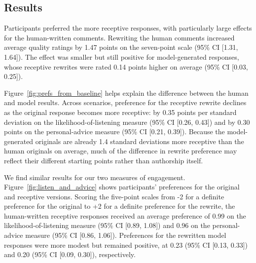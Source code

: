 \documentclass[letterpaper]{article} %
\begin{document}

\subsection{Results}

Participants preferred the more receptive responses, with particularly large effects for the human-written comments. Rewriting the human comments increased average quality ratings by 1.47 points on the seven-point scale (95\% CI [1.31, 1.64]). The effect was smaller but still positive for model-generated responses, whose receptive rewrites were rated 0.14 points higher on average (95\% CI [0.03, 0.25]).

Figure~\ref{fig:prefs_from_baseline} helps explain the difference between the human and model results. Across scenarios, preference for the receptive rewrite declines as the original response becomes more receptive: by 0.35 points per standard deviation on the likelihood-of-listening measure (95\% CI [0.26, 0.43]) and by 0.30 points on the personal-advice measure (95\% CI [0.21, 0.39]). Because the model-generated originals are already 1.4 standard deviations more receptive than the human originals on average, much of the difference in rewrite preference may reflect their different starting points rather than authorship itself.

We find similar results for our two measures of engagement. Figure~\ref{fig:listen_and_advice} shows participants' preferences for the original and receptive versions. Scoring the five-point scales from -2 for a definite preference for the original to +2 for a definite preference for the rewrite, the human-written receptive responses received an average preference of 0.99 on the likelihood-of-listening measure (95\% CI [0.89, 1.08]) and 0.96 on the personal-advice measure (95\% CI [0.86, 1.06]). Preferences for the rewritten model responses were more modest but remained positive, at 0.23 (95\% CI [0.13, 0.33]) and 0.20 (95\% CI [0.09, 0.30]), respectively. 
\end{document}
